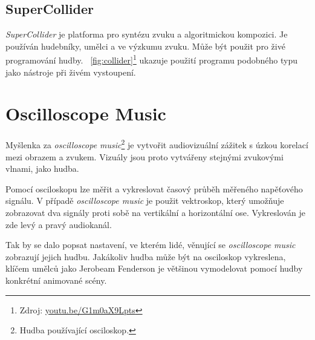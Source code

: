 \documentclass[thesis=B, czech]{FITthesis}[2019/03/06]
\begin{document}




\subsection*{SuperCollider}

\textit{SuperCollider} je platforma pro syntézu zvuku a algoritmickou kompozici. Je používán hudebníky, umělci a ve výzkumu zvuku. Může být použit pro živé programování hudby. \figurename~\ref{fig:collider}\footnote{Zdroj: \url{youtu.be/G1m0aX9Lpts}} ukazuje použití programu podobného typu jako nástroje při živém vystoupení.



\newpage

\section{Oscilloscope Music}


Myšlenka za \textit{oscilloscope music}\footnote{Hudba používající osciloskop.} je vytvořit audiovizuální zážitek s úzkou korelací mezi obrazem a zvukem. Vizuály jsou proto vytvářeny stejnými zvukovými vlnami, jako hudba.

Pomocí osciloskopu lze měřit a vykreslovat časový průběh měřeného napěťového signálu. V případě \textit{oscilloscope music} je použit vektroskop, který umožňuje zobrazovat dva signály proti sobě na vertikální a horizontální ose. Vykreslován je zde levý a pravý audiokanál.

Tak by se dalo popsat nastavení, ve kterém lidé, věnující se \textit{oscilloscope music} zobrazují jejich hudbu. Jakákoliv hudba může být na osciloskop vykreslena, klíčem umělců jako Jerobeam Fenderson je většinou vymodelovat pomocí hudby konkrétní animované scény.
\end{document}
